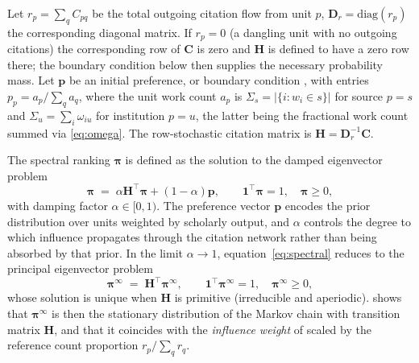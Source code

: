 Let $r_p=\sum_q C_{pq}$ be the total outgoing citation flow from unit $p$,
$\mathbf{D}_r=\mathrm{diag}(r_p)$ the corresponding diagonal matrix.
If $r_p=0$ (a dangling unit with no outgoing citations) the corresponding
row of $\mathbf{C}$ is zero and $\mathbf{H}$ is defined to have a zero row
there; the boundary condition below then supplies the necessary probability
mass.
Let $\mathbf{p}$ be an initial preference, or boundary condition
\citep{hubbellInputoutputApproachClique1965, vignaSpectralRanking2016},
with entries $p_p = a_p / \sum_q a_q$,
where the unit work count $a_p$ is
$\Sigma_s = |\{i : w_i \in s\}|$ for source $p=s$
and
$\Sigma_u = \sum_i \omega_{iu}$ for institution $p=u$,
the latter being the fractional work count summed via \eqref{eq:omega}.
The row-stochastic citation matrix is
$\mathbf{H}=\mathbf{D}_r^{-1}\mathbf{C}$.

The spectral ranking $\boldsymbol{\pi}$
\citep[see][for an overview]{vignaSpectralRanking2016}
is defined as the solution to the damped eigenvector problem
\begin{equation}
    \boldsymbol{\pi}
    \;=\;
    \alpha\mathbf{H}^\top\boldsymbol{\pi}
    +(1-\alpha)\mathbf{p},
    \qquad
    \mathbf{1}^\top\boldsymbol{\pi}=1,
    \quad
    \boldsymbol{\pi}\ge 0,
    \label{eq:spectral}
\end{equation}
with damping factor $\alpha\in[0,1)$.
The preference vector $\mathbf{p}$ encodes the prior distribution over
units weighted by scholarly output, and $\alpha$ controls the degree to
which influence propagates through the citation network rather than
being absorbed by that prior.
In the limit $\alpha\to 1$, equation~\eqref{eq:spectral} reduces to the
principal eigenvector problem
\begin{equation}
    \boldsymbol{\pi}^{\infty}
    \;=\;
    \mathbf{H}^\top\boldsymbol{\pi}^{\infty},
    \qquad
    \mathbf{1}^\top\boldsymbol{\pi}^{\infty}=1,
    \quad
    \boldsymbol{\pi}^{\infty}\ge 0,
    \label{eq:eig}
\end{equation}
whose solution is unique when $\mathbf{H}$ is primitive (irreducible and
aperiodic). \cite{gellerCitationInfluenceMethodology1978} shows that
$\boldsymbol{\pi}^{\infty}$ is then the stationary distribution of the
Markov chain with transition matrix $\mathbf{H}$, and that it coincides
with the \textit{influence weight} of \cite{pinskiCitationInfluenceJournal1976}
scaled by the reference count proportion $r_p / \sum_q r_q$.

